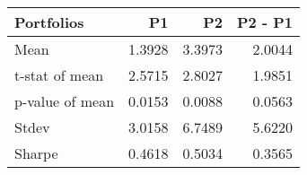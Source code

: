 \begin{tabular}{lrrr}
\toprule
Portfolios & P1 & P2 & P2 - P1 \\
\midrule
Mean & 1.3928 & 3.3973 & 2.0044 \\
t-stat of mean & 2.5715 & 2.8027 & 1.9851 \\
p-value of mean & 0.0153 & 0.0088 & 0.0563 \\
Stdev & 3.0158 & 6.7489 & 5.6220 \\
Sharpe & 0.4618 & 0.5034 & 0.3565 \\
\bottomrule
\end{tabular}
